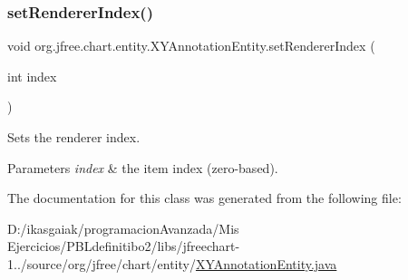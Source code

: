 \subsubsection{\texorpdfstring{set\+Renderer\+Index()}{setRendererIndex()}}
{\footnotesize\ttfamily void org.\+jfree.\+chart.\+entity.\+X\+Y\+Annotation\+Entity.\+set\+Renderer\+Index (\begin{DoxyParamCaption}\item[{int}]{index }\end{DoxyParamCaption})}

Sets the renderer index.


\begin{DoxyParams}{Parameters}
{\em index} & the item index (zero-\/based). \\
\hline
\end{DoxyParams}


The documentation for this class was generated from the following file\+:\begin{DoxyCompactItemize}
\item 
D\+:/ikasgaiak/programacion\+Avanzada/\+Mis Ejercicios/\+P\+B\+Ldefinitibo2/libs/jfreechart-\/1../source/org/jfree/chart/entity/\mbox{\hyperlink{_x_y_annotation_entity_8java}{X\+Y\+Annotation\+Entity.\+java}}\end{DoxyCompactItemize}

